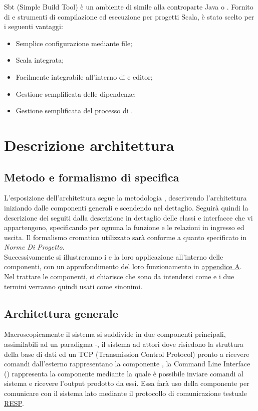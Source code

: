 \documentclass{scalatekids-article}
\begin{document}
Sbt (Simple Build Tool) è un ambiente di  simile alla controparte Java  o
. Fornito di  e strumenti di compilazione ed
esecuzione per progetti Scala, è stato scelto per i seguenti vantaggi:
\begin{itemize}
\item Semplice configurazione mediante file;
\item {} Scala integrata;
\item Facilmente integrabile all'interno di  e editor;
\item Gestione semplificata delle dipendenze;
\item Gestione semplificata del processo di .
\end{itemize}

\section{Descrizione architettura}

\subsection{Metodo e formalismo di specifica}

L'esposizione dell'architettura segue la metodologia ,
descrivendo l'architettura iniziando dalle componenti generali e scendendo
nel dettaglio. Seguirà quindi la descrizione dei  seguiti dalla descrizione
in dettaglio delle classi e interfacce che vi appartengono, specificando
per ognuna la funzione e le relazioni in ingresso ed uscita. Il formalismo
cromatico utilizzato sarà conforme a quanto specificato in \textit{Norme Di Progetto}.\\
Successivamente si illustreranno i  e la loro applicazione
all'interno delle componenti, con un approfondimento del loro funzionamento
in \hyperref[sec:appendice]{appendice A}.\\
Nel trattare le componenti, si chiarisce che sono da intendersi come 
e i due termini verranno quindi usati come sinonimi.\\

\subsection{Architettura generale}

Macroscopicamente il sistema si suddivide in due componenti principali,
assimilabili ad un paradigma -, il sistema ad attori dove risiedono
la struttura della base di dati ed un  TCP (Transmission Control Protocol)
pronto a ricevere comandi dall'esterno rappresentano la componente , la
Command Line Interface () rappresenta la componente  mediante la quale
è possibile inviare comandi al sistema e ricevere l'output prodotto da essi.
Essa farà uso della componente  per comunicare con il sistema lato
 mediante il protocollo di comunicazione testuale \hyperref[sec:RESP]{RESP}.\\
\end{document}
